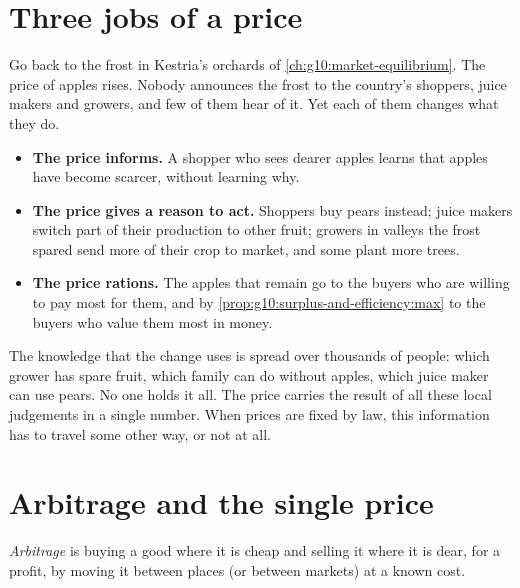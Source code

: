 \section{Three jobs of a price}\label{sec:g10:what-prices-do:jobs}

Go back to the frost in Kestria's orchards of \cref{ch:g10:market-equilibrium}. The price of apples rises. Nobody announces the frost to the
country's shoppers, juice makers and growers, and few of them hear of it. Yet each of them changes what they do.

\begin{itemize}
\item \textbf{The price informs.} A shopper who sees dearer apples learns that apples have become scarcer, without learning why.
\item \textbf{The price gives a reason to act.} Shoppers buy pears instead; juice makers switch part of their production to other fruit; growers in
  valleys the frost spared send more of their crop to market, and some plant more trees.
\item \textbf{The price rations.} The apples that remain go to the buyers who are willing to pay most for them, and by \cref{prop:g10:surplus-and-efficiency:max}
  to the buyers who value them most in money.
\end{itemize}

The knowledge that the change uses is spread over thousands of people: which grower has spare fruit, which family can do without apples, which juice
maker can use pears. No one holds it all. The price carries the result of all these local judgements in a single number. When prices are fixed by law,
this information has to travel some other way, or not at all.

\section{Arbitrage and the single price}\label{sec:g10:what-prices-do:arbitrage}

\begin{definition}[Arbitrage]\label{def:g10:what-prices-do:arbitrage}
\emph{Arbitrage} is buying a good where it is cheap and selling it where it is dear, for a profit, by moving it between places (or
between markets) at a known cost.
\end{definition}

